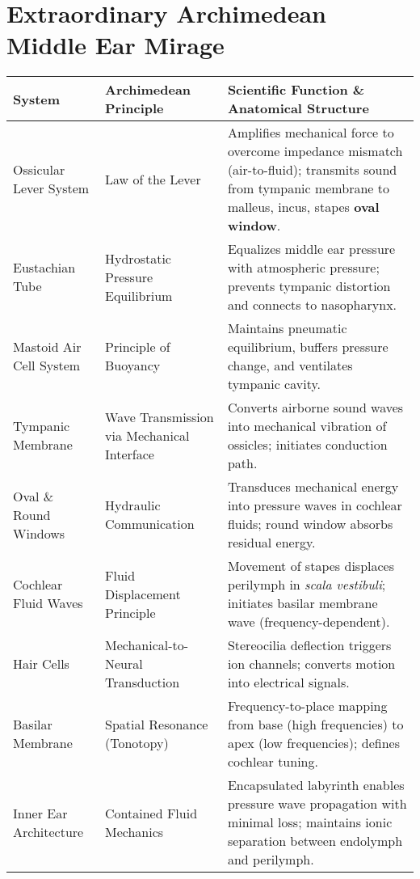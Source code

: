 \documentclass{article}
\begin{document}
\section*{Extraordinary Archimedean Middle Ear Mirage}

\begin{tabularx}{\textwidth}{>{\raggedright\arraybackslash}p{3.3cm} >{\raggedright\arraybackslash}p{4.3cm} >{\raggedright\arraybackslash}X}
\toprule
\textbf{System} & \textbf{Archimedean Principle} & \textbf{Scientific Function \& Anatomical Structure} \\
\midrule

Ossicular Lever System & Law of the Lever & Amplifies mechanical force to overcome impedance mismatch (air-to-fluid); transmits sound from tympanic membrane to malleus, incus, stapes \textrightarrow{} \textbf{oval window}. \\

Eustachian Tube & Hydrostatic Pressure Equilibrium & Equalizes middle ear pressure with atmospheric pressure; prevents tympanic distortion and connects to nasopharynx. \\

Mastoid Air Cell System & Principle of Buoyancy & Maintains pneumatic equilibrium, buffers pressure change, and ventilates tympanic cavity. \\

Tympanic Membrane & Wave Transmission via Mechanical Interface & Converts airborne sound waves into mechanical vibration of ossicles; initiates conduction path. \\

Oval \& Round Windows & Hydraulic Communication & Transduces mechanical energy into pressure waves in cochlear fluids; round window absorbs residual energy. \\

Cochlear Fluid Waves & Fluid Displacement Principle & Movement of stapes displaces perilymph in \textit{scala vestibuli}; initiates basilar membrane wave (frequency-dependent). \\

Hair Cells & Mechanical-to-Neural Transduction & Stereocilia deflection triggers ion channels; converts motion into electrical signals. \\

Basilar Membrane & Spatial Resonance (Tonotopy) & Frequency-to-place mapping from base (high frequencies) to apex (low frequencies); defines cochlear tuning. \\

Inner Ear Architecture & Contained Fluid Mechanics & Encapsulated labyrinth enables pressure wave propagation with minimal loss; maintains ionic separation between endolymph and perilymph. \\
\bottomrule
\end{tabularx}
\end{document}
